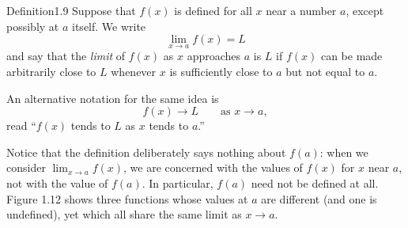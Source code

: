 \documentclass[a4paper,12pt,oneside]{memoir}
\begin{document}
\begin{envdefinition}{Definition}{1.9}{}
Suppose that \(f(x)\) is defined for all \(x\) near a number \(a\), except possibly at \(a\) itself. We write \[ \lim_{x \to a} f(x) = L \] and say that the \emph{limit} of \(f(x)\) as \(x\) approaches \(a\) is \(L\) if \(f(x)\) can be made arbitrarily close to \(L\) whenever \(x\) is sufficiently close to \(a\) but not equal to \(a\).
\end{envdefinition}
An alternative notation for the same idea is \[ f(x) \to L \qquad \text{as } x \to a, \] read “\(f(x)\) tends to \(L\) as \(x\) tends to \(a\).”

Notice that the definition deliberately says nothing about \(f(a)\): when we consider \(\lim_{x \to a} f(x)\), we are concerned with the values of \(f(x)\) for \(x\) near \(a\), not with the value of \(f(a)\). In particular, \(f(a)\) need not be defined at all. Figure 1.12 shows three functions whose values at \(a\) are different (and one is undefined), yet which all share the same limit as \(x \to a\).
\end{document}

